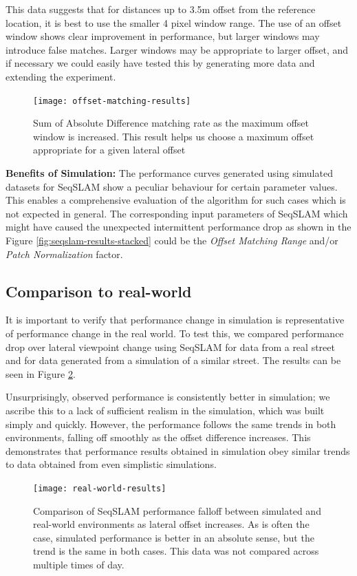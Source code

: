 \documentclass[letterpaper, 10 pt, conference]{ieeeconf}  %
\begin{document}
This data suggests that for distances up to 3.5m offset from the reference location, it is best to use the smaller 4 pixel window range. The use of an offset window shows clear improvement in performance, but larger windows may  introduce false matches. Larger windows may be appropriate to larger offset, and if necessary we could easily have tested this by generating more data and extending the experiment.

\begin{figure}[t]
    \centering
    \texttt{[image: offset-matching-results]}
    \caption{Sum of Absolute Difference matching rate as the maximum offset window is increased. This result helps us choose a maximum offset appropriate for a given lateral offset}
    \label{fig:offset-matching-param-results}
\end{figure}

\textbf{Benefits of Simulation:} The performance curves generated using simulated datasets for SeqSLAM show a peculiar behaviour for certain parameter values. This enables a comprehensive evaluation of the algorithm for such cases which is not expected in general. The corresponding input parameters of SeqSLAM which might have caused the unexpected intermittent performance drop as shown in the Figure \ref{fig:seqslam-results-stacked} could be the \emph{Offset Matching Range} and/or \emph{Patch Normalization} factor.

\subsection{Comparison to real-world}

It is important to verify that performance change in simulation is representative of performance change in the real world. To test this, we compared performance drop over lateral viewpoint change using SeqSLAM for data from a real street and for data generated from a simulation of a similar street. The results can be seen in Figure \ref{fig:real-world-results}.

Unsurprisingly, observed performance is consistently better in simulation; we ascribe this to a lack of sufficient realism in the simulation, which was built simply and quickly. However, the performance follows the same trends in both environments, falling off smoothly as the offset difference increases. This demonstrates that performance results obtained in simulation obey similar trends to data obtained from even simplistic simulations.

\begin{figure}[t]
    \centering
    \texttt{[image: real-world-results]}
    \caption{Comparison of SeqSLAM performance falloff between simulated and real-world environments as lateral offset increases. As is often the case, simulated performance is better in an absolute sense, but the trend is the same in both cases. This data was not compared across multiple times of day.}
    \label{fig:real-world-results}
\end{figure}
\end{document}
